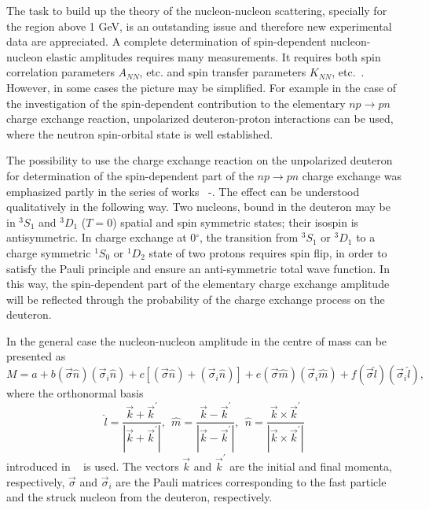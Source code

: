 The task to build up the theory of the nucleon-nucleon scattering, specially
for the region above 1 GeV, is an outstanding issue and therefore new
 experimental data are appreciated. A complete determination of spin-dependent
nucleon-nucleon elastic amplitudes requires many measurements. It requires
both spin correlation  parameters $A_{NN}$, etc. and spin transfer parameters
$K_{NN}$, etc.~\cite{Bil}.
 However, in some cases the picture may be simplified.
For example in the case of the investigation
of the spin-dependent
contribution to the elementary $np\to pn$ charge exchange reaction,
 unpolarized deuteron-proton
interactions can be used,
where the neutron spin-orbital state is well established.

The possibility to use the charge exchange reaction on the unpolarized
deuteron for determination of the spin-dependent part of the $np\to pn$ charge
exchange was emphasized partly in the series of works  ~\cite{Mig}-\cite{Bugg}.
The effect can be understood qualitatively in
the following way. Two nucleons, bound in the deuteron may be in $^{3}S_{1}$
and $^{3}D_{1}$ ($T=0$) spatial and spin symmetric states; their isospin
is antisymmetric. In charge exchange at 0$^{\circ}$, the transition from
$^{3}S_{1}$ or $^{3}D_{1}$
to a charge
symmetric $^{1}S_{0}$ or $^{1}D_{2}$
state of two protons requires spin flip, in order
to satisfy the Pauli principle and ensure an anti-symmetric total
wave function.
 In this
way, the spin-dependent part of the elementary charge exchange amplitude
will be
reflected through the probability of the charge exchange process
on the deuteron.

In the general case the nucleon-nucleon amplitude in the centre of mass
can be presented as
\begin{equation}
M=a+b(\vec\sigma \hat n)(\vec\sigma _i \hat n)+
c[(\vec\sigma \hat n)+(\vec\sigma _i \hat n)]+
e(\vec\sigma \hat m)(\vec\sigma _i \hat m)+
f(\vec\sigma \hat l)(\vec\sigma _i \hat l),
\end{equation}
where the orthonormal basis
\begin{equation}
\hat l =\frac {\vec k +\vec k^\prime}{|\vec k +\vec k^\prime|},~~
\hat m =\frac {\vec k -\vec k^\prime}{|\vec k -\vec k^\prime|},~~
\hat n =\frac {\vec k \times\vec k^\prime}{|\vec k \times\vec k^\prime|}
\end{equation}
introduced in  ~\cite{Gold} is used. The vectors
$\vec k$ and $\vec k^\prime$ are
the initial and final momenta, respectively, $\vec\sigma $ and
$\vec\sigma_i$ are the Pauli matrices corresponding to
the fast particle and the struck nucleon from the deuteron, respectively.

